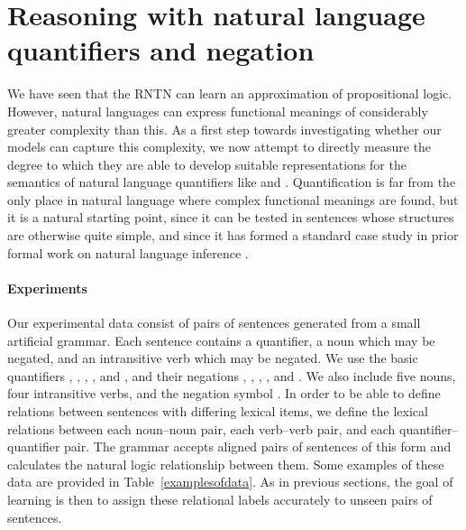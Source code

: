 \section{Reasoning with natural language quantifiers and negation}\label{sec:quantifiers}

We have seen that the RNTN can learn an approximation of propositional
logic.  However, natural languages can express functional meanings of
considerably greater complexity than this.  As a first step towards
investigating whether our models can capture this complexity, we now
attempt to directly measure the degree to which they are able to
develop suitable representations for the semantics of natural language
quantifiers like  and . Quantification is far from
the only place in natural language where complex functional meanings
are found, but it is a natural starting point, since it can be tested
in sentences whose structures are otherwise quite simple, and since it
has formed a standard case study in prior formal work on natural
language inference \cite{Icard:Moss:2013:LILT}.



\paragraph{Experiments}
Our experimental data consist of pairs of sentences generated from a
small artificial grammar. Each sentence contains a quantifier, a noun
which may be negated, and an intransitive verb which may be
negated. We use the basic quantifiers , , ,
, and , and their negations , ,
, , and . We also
include five nouns, four intransitive verbs, and the negation symbol
. In order to be able to define relations between sentences
with differing lexical items, we define the lexical relations between
each noun--noun pair, each verb--verb pair, and each
quantifier--quantifier pair. The grammar accepts aligned pairs of
sentences of this form and calculates the natural logic relationship
between them.  Some examples of these data are provided in
Table~\ref{examplesofdata}.  As in previous sections, the goal of
learning is then to assign these relational labels accurately to
unseen pairs of sentences.


